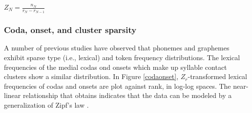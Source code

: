 \begin{example}
$\displaystyle Z_N = \frac{n_N}{r_N - r_{N - 1}}$
\end{example}



\subsubsection{Coda, onset, and cluster sparsity}

A number of previous studies \citep[e.g.,][]{Sigurd1968,Good1969,Borodovsky1989,Witten1990,Martindale1996,Tambovtsev2007} have observed that phonemes and graphemes exhibit sparse type (i.e., lexical) and token frequency distributions. The lexical frequencies of the medial codas ond onsets which make up syllable contact clusters show a similar distribution. In Figure \ref{codaonset}, $Z_r$-transformed lexical frequencies of codas and onsets are plot against rank, in log-log spaces. The near-linear relationship that obtains indicates that the data can be modeled by a generalization of Zipf's law \citep{Zipf1949}.

